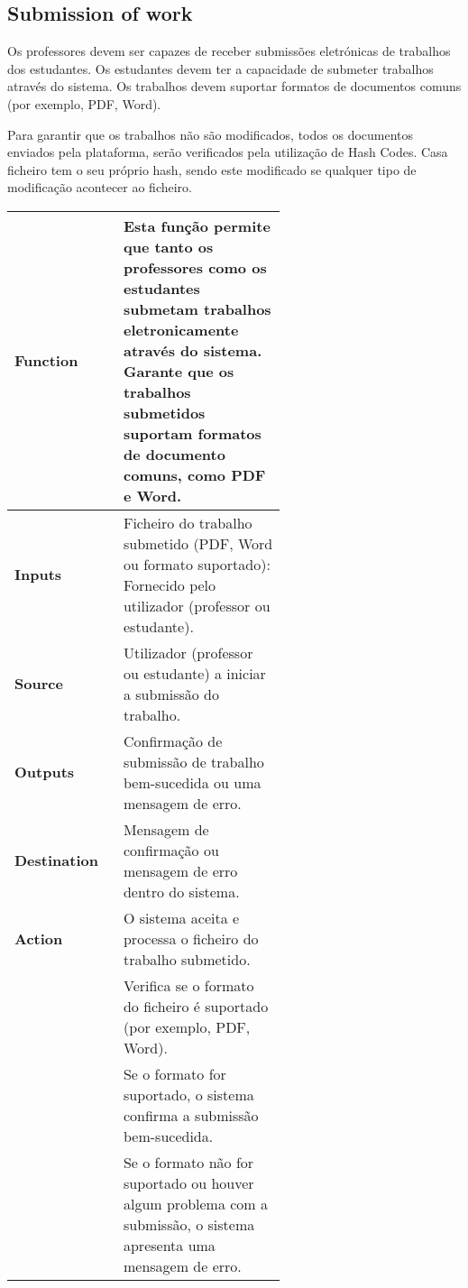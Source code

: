 \documentclass[10pt]{article}
\begin{document}
\newpage

\subsection{Submission of work}
Os professores devem ser capazes de receber submissões eletrónicas de 
trabalhos dos estudantes. Os estudantes devem ter a capacidade de 
submeter trabalhos através do sistema. Os trabalhos devem suportar 
formatos de documentos comuns (por exemplo, PDF, Word).

Para garantir que os trabalhos não são modificados, todos os documentos enviados pela
plataforma, serão verificados pela utilização de Hash Codes.
Casa ficheiro tem o seu próprio hash, sendo este modificado se qualquer tipo de modificação
acontecer ao ficheiro.

\begin{table}[H]
    \centering
    \begin{tabular}{|l|p{0.6\linewidth}|}
        \hline
        \textbf{Function} & Esta função permite que tanto os professores como os estudantes submetam trabalhos eletronicamente 
        através do sistema. Garante que os trabalhos submetidos suportam formatos de documento comuns, como PDF e Word. \\
        \hline
        \textbf{Inputs} & Ficheiro do trabalho submetido (PDF, Word ou formato suportado): 
        Fornecido pelo utilizador (professor ou estudante). \\
        \hline
        \textbf{Source} & Utilizador (professor ou estudante) a iniciar a submissão do trabalho. \\
        \hline
        \textbf{Outputs} & Confirmação de submissão de trabalho bem-sucedida ou uma mensagem de erro. \\
        \hline
        \textbf{Destination} & Mensagem de confirmação ou mensagem de erro dentro do sistema. \\
        \hline
        \textbf{Action} & O sistema aceita e processa o ficheiro do trabalho submetido. \\
                        & Verifica se o formato do ficheiro é suportado (por exemplo, PDF, Word). \\
                        & Se o formato for suportado, o sistema confirma a submissão bem-sucedida. \\
                        & Se o formato não for suportado ou houver algum problema com a submissão, o sistema apresenta uma mensagem de erro. \\
                        \hline

\end{tabular}
\end{table}
\end{document}
